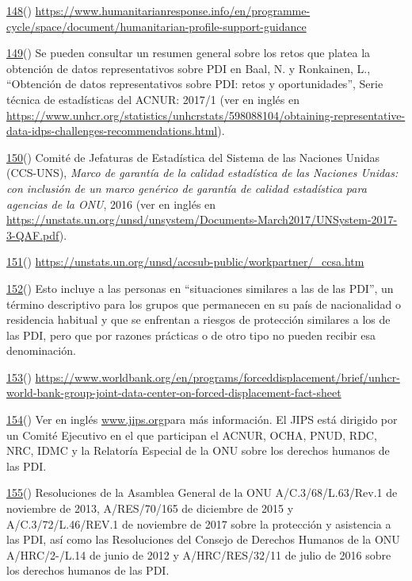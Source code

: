 \documentclass[
]{book}
\begin{document}
\protect\hyperlink{sdfootnote148anc}{148}() \url{https://www.humanitarianresponse.info/en/programme-cycle/space/document/humanitarian-profile-support-guidance}

\protect\hyperlink{sdfootnote149anc}{149}() Se pueden consultar un resumen general sobre los retos que platea la obtención de datos representativos sobre PDI en Baal, N. y Ronkainen, L., ``Obtención de datos representativos sobre PDI: retos y oportunidades'', Serie técnica de estadísticas del ACNUR: 2017/1 (ver en inglés en \url{https://www.unhcr.org/statistics/unhcrstats/598088104/obtaining-representative-data-idps-challenges-recommendations.html}).

\protect\hyperlink{sdfootnote150anc}{150}() Comité de Jefaturas de Estadística del Sistema de las Naciones Unidas (CCS-UNS), \emph{Marco de garantía de la calidad estadística de las Naciones Unidas: con inclusión de un marco genérico de garantía de calidad estadística para agencias de la ONU}, 2016 (ver en inglés en \url{https://unstats.un.org/unsd/unsystem/Documents-March2017/UNSystem-2017-3-QAF.pdf}).

\protect\hyperlink{sdfootnote151anc}{151}() \url{https://unstats.un.org/unsd/accsub-public/workpartner/_ccsa.htm}

\protect\hyperlink{sdfootnote152anc}{152}() Esto incluye a las personas en ``situaciones similares a las de las PDI'', un término descriptivo para los grupos que permanecen en su país de nacionalidad o residencia habitual y que se enfrentan a riesgos de protección similares a los de las PDI, pero que por razones prácticas o de otro tipo no pueden recibir esa denominación.

\protect\hyperlink{sdfootnote153anc}{153}() \url{https://www.worldbank.org/en/programs/forceddisplacement/brief/unhcr-world-bank-group-joint-data-center-on-forced-displacement-fact-sheet}

\protect\hyperlink{sdfootnote154anc}{154}() Ver en inglés \href{http://www.jips.org/}{www.jips.org}para más información. El JIPS está dirigido por un Comité Ejecutivo en el que participan el ACNUR, OCHA, PNUD, RDC, NRC, IDMC y la Relatoría Especial de la ONU sobre los derechos humanos de las PDI.

\protect\hyperlink{sdfootnote155anc}{155}() Resoluciones de la Asamblea General de la ONU A/C.3/68/L.63/Rev.1 de noviembre de 2013, A/RES/70/165 de diciembre de 2015 y A/C.3/72/L.46/REV.1 de noviembre de 2017 sobre la protección y asistencia a las PDI, así como las Resoluciones del Consejo de Derechos Humanos de la ONU A/HRC/2-/L.14 de junio de 2012 y A/HRC/RES/32/11 de julio de 2016 sobre los derechos humanos de las PDI.
\end{document}

